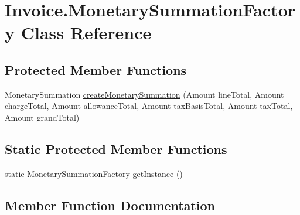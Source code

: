 \hypertarget{class_invoice_1_1_monetary_summation_factory}{}\section{Invoice.\+Monetary\+Summation\+Factory Class Reference}
\label{class_invoice_1_1_monetary_summation_factory}
\subsection*{Protected Member Functions}
\begin{DoxyCompactItemize}
\item 
Monetary\+Summation \hyperlink{class_invoice_1_1_monetary_summation_factory_a52fc66fbae5e7dee3f5214876c034e57}{create\+Monetary\+Summation} (Amount line\+Total, Amount charge\+Total, Amount allowance\+Total, Amount tax\+Basis\+Total, Amount tax\+Total, Amount grand\+Total)
\end{DoxyCompactItemize}
\subsection*{Static Protected Member Functions}
\begin{DoxyCompactItemize}
\item 
static \hyperlink{class_invoice_1_1_monetary_summation_factory}{Monetary\+Summation\+Factory} \hyperlink{class_invoice_1_1_monetary_summation_factory_a0c63357233ad7ce8435d8dabddbcbd80}{get\+Instance} ()
\end{DoxyCompactItemize}


\subsection{Member Function Documentation}
